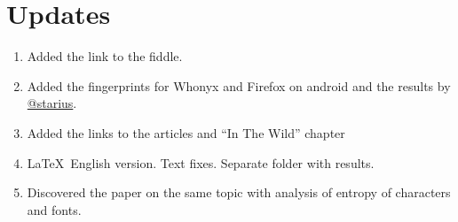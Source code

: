 \documentclass[letterpaper,14pt]{article}
\begin{document}
\nocite{*}
\printbibliography[heading=bibnumbered]


\section{Updates}\label{updates}
\begin{enumerate}
\itemsep1pt\parskip0pt
\item
  Added the link to the fiddle.
\item
  Added the fingerprints for Whonyx and Firefox on android and the
  results by \href{https://geektimes.ru/users/starius/}{@starius}.
\item
  Added the links to the articles and ``In The Wild'' chapter
\item
   \LaTeX\ English version. Text fixes. Separate folder with results.
\item
   Discovered the paper\cite{Fifield2015} on the same topic with analysis of entropy of characters and fonts.
\end{enumerate}


{\footnotesize}
\appendix
\end{document}
